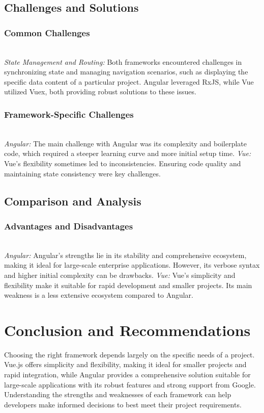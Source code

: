 \documentclass[conference]{IEEEtran}
\begin{document}
\subsection{Challenges and Solutions}
\subsubsection{Common Challenges}
\textit{\\State Management and Routing:} Both frameworks encountered challenges in synchronizing state and managing navigation scenarios, such as displaying the specific data content of a particular project. Angular leveraged RxJS, while Vue utilized Vuex, both providing robust solutions to these issues.
\newline
\subsubsection{Framework-Specific Challenges}
\textit{\\Angular: }The main challenge with Angular was its complexity and boilerplate code, which required a steeper learning curve and more initial setup time.
\newline\textit{Vue: }Vue's flexibility sometimes led to inconsistencies. Ensuring code quality and maintaining state consistency were key challenges.

\subsection{Comparison and Analysis}
\subsubsection{Advantages and Disadvantages}
\textit{\\Angular: }Angular's strengths lie in its stability and comprehensive ecosystem, making it ideal for large-scale enterprise applications. However, its verbose syntax and higher initial complexity can be drawbacks.
\newline\textit{Vue: }Vue's simplicity and flexibility make it suitable for rapid development and smaller projects. Its main weakness is a less extensive ecosystem compared to Angular.

\section{Conclusion and Recommendations}
Choosing the right framework depends largely on the specific needs of a project. Vue.js offers simplicity and flexibility, making it ideal for smaller projects and rapid integration, while Angular provides a comprehensive solution suitable for large-scale applications with its robust features and strong support from Google. Understanding the strengths and weaknesses of each framework can help developers make informed decisions to best meet their project requirements.
\end{document}
